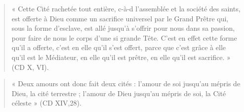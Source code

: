 \begin{quote}
    « Cette Cité rachetée tout entière, c-à-d l’assemblée et la société des saints, est offerte à Dieu comme un sacrifice universel par le Grand Prêtre qui, sous la forme d’esclave, est allé jusqu’à s’offrir pour nous dans sa passion, pour faire de nous le corps d’une si grande Tête. C’est en effet cette forme qu’il a offerte, c’est en elle qu’il s’est offert, parce que c’est grâce à elle qu’il est le Médiateur, en elle qu’il est prêtre, en elle qu’il est sacrifice. » (CD X, VI). 
\end{quote}
\begin{quote}
    « Deux amours ont donc fait deux cités : l’amour de soi jusqu’au mépris de Dieu, la cité terrestre ; l’amour de Dieu jusqu’au mépris de soi, la Cité céleste » (CD XIV,28). 
\end{quote}





